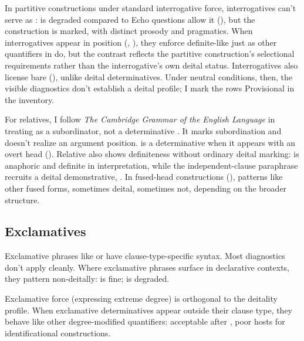 \documentclass[12pt,letterpaper]{article}
\begin{document}
In partitive constructions under standard interrogative force, interrogatives can't serve as :  is degraded compared to  Echo questions allow it (), but the construction is marked, with distinct prosody and pragmatics. When interrogatives appear in  position (, ), they enforce definite-like  just as other quantifiers in  do, but the contrast reflects the partitive construction's selectional requirements rather than the interrogative's own deital status. Interrogatives also license bare  (), unlike deital determinatives. Under neutral conditions, then, the visible diagnostics don't establish a deital profile; I mark the rows Provisional in the inventory.

For relatives, I follow \emph{The Cambridge Grammar of the English Language} in treating  as a subordinator, not a determinative \parencite{HuddlestonPullum2002}. It marks subordination and doesn't realize an argument position.  is a determinative when it appears with an overt head (). Relative  also shows definiteness without ordinary deital marking:  is anaphoric and definite in interpretation, while the independent-clause paraphrase recruits a deital demonstrative, . In fused-head constructions (),  patterns like other fused forms, sometimes deital, sometimes not, depending on the broader structure.

\subsection{Exclamatives}

Exclamative phrases like  or  have clause-type-specific syntax. Most diagnostics don't apply cleanly. Where exclamative phrases surface in declarative contexts, they pattern non-deitally:  is fine;  is degraded.

Exclamative force (expressing extreme degree) is orthogonal to the deitality profile. When exclamative determinatives appear outside their clause type, they behave like other degree-modified quantifiers: acceptable after , poor hosts for identificational constructions.
\end{document}
